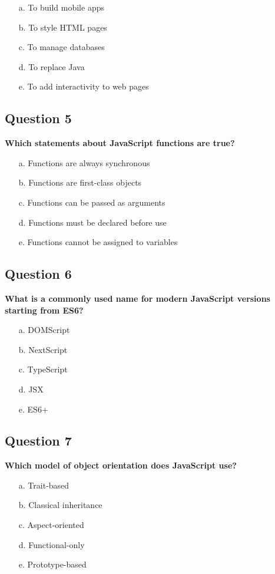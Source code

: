 \documentclass{article}
\begin{document}
\begin{itemize}
  \item[a.] To build mobile apps
  \item[b.] To style HTML pages
  \item[c.] To manage databases
  \item[d.] To replace Java
  \item[e.] To add interactivity to web pages
\end{itemize}

\subsection*{Question 5}
\textbf{Which statements about JavaScript functions are true?}

\begin{itemize}
  \item[a.] Functions are always synchronous
  \item[b.] Functions are first-class objects
  \item[c.] Functions can be passed as arguments
  \item[d.] Functions must be declared before use
  \item[e.] Functions cannot be assigned to variables
\end{itemize}

\subsection*{Question 6}
\textbf{What is a commonly used name for modern JavaScript versions starting from ES6?}

\begin{itemize}
  \item[a.] DOMScript
  \item[b.] NextScript
  \item[c.] TypeScript
  \item[d.] JSX
  \item[e.] ES6+
\end{itemize}

\subsection*{Question 7}
\textbf{Which model of object orientation does JavaScript use?}

\begin{itemize}
  \item[a.] Trait-based
  \item[b.] Classical inheritance
  \item[c.] Aspect-oriented
  \item[d.] Functional-only
  \item[e.] Prototype-based
\end{itemize}
\end{document}
